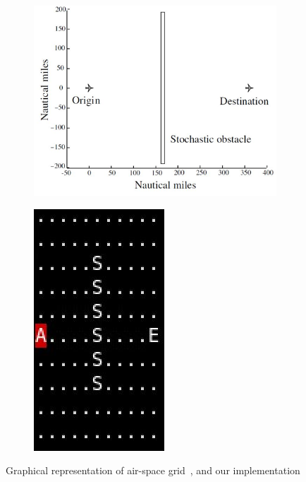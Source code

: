 \documentclass[11pt,reqno]{amsart}
\theoremstyle{definition}
\numberwithin{equation}{section}
\theoremstyle{remark}
\begin{document}
\begin{figure}
\centering
\begin{subfigure}{0.6\linewidth}
    \centering
    \includegraphics[width=0.8\linewidth]{aircraft-1.png}
\end{subfigure}%
\begin{subfigure}{0.4\linewidth}
    \centering
    \includegraphics[width=0.5\linewidth]{aircraft-2.png}
\end{subfigure}
\caption{Graphical representation of air-space grid~\cite{nilim2005robust}, and our implementation}
\label{aircraft_grid}
\end{figure}
\end{document}
